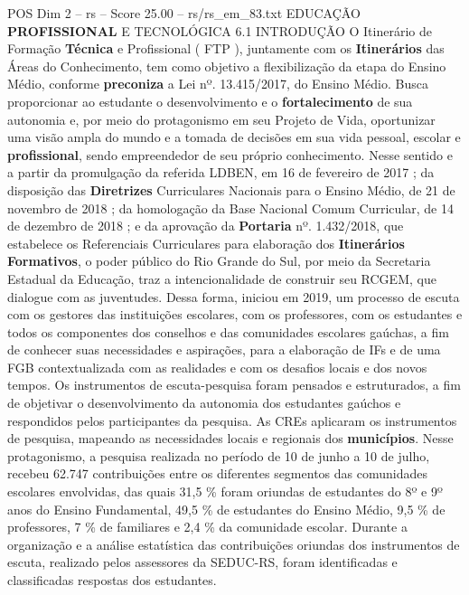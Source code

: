 \begin{textsample}{POS Dim 2 – rs – Score 25.00 – rs/rs\_em\_83.txt}  \label{ex:f2_pos_079}
EDUCAÇÃO \textbf{PROFISSIONAL} E TECNOLÓGICA 6.1 INTRODUÇÃO O Itinerário de Formação \textbf{Técnica} e Profissional ( FTP ), juntamente com os \textbf{Itinerários} das Áreas do Conhecimento, tem como objetivo a flexibilização da etapa do Ensino Médio, conforme \textbf{preconiza} a Lei nº. 13.415/2017, do Ensino Médio.
Busca proporcionar ao estudante o desenvolvimento e o \textbf{fortalecimento} de sua autonomia e, por meio do protagonismo em seu Projeto de Vida, oportunizar uma visão ampla do mundo e a tomada de decisões em sua vida pessoal, escolar e \textbf{profissional}, sendo empreendedor de seu próprio conhecimento.
Nesse sentido e a partir da promulgação da referida LDBEN, em 16 de fevereiro de 2017 ; da disposição das \textbf{Diretrizes} Curriculares Nacionais para o Ensino Médio, de 21 de novembro de 2018 ; da homologação da Base Nacional Comum Curricular, de 14 de dezembro de 2018 ; e da aprovação da \textbf{Portaria} nº. 1.432/2018, que estabelece os Referenciais Curriculares para elaboração dos \textbf{Itinerários} \textbf{Formativos}, o poder público do Rio Grande do Sul, por meio da Secretaria Estadual da Educação, traz a intencionalidade de construir seu RCGEM, que dialogue com as juventudes.
Dessa forma, iniciou em 2019, um processo de escuta com os gestores das instituições escolares, com os professores, com os estudantes e todos os componentes dos conselhos e das comunidades escolares gaúchas, a fim de conhecer suas necessidades e aspirações, para a elaboração de IFs e de uma FGB contextualizada com as realidades e com os desafios locais e dos novos tempos.
Os instrumentos de escuta-pesquisa foram pensados e estruturados, a fim de objetivar o desenvolvimento da autonomia dos estudantes gaúchos e respondidos pelos participantes da pesquisa.
As CREs aplicaram os instrumentos de pesquisa, mapeando as necessidades locais e regionais dos \textbf{municípios}.
Nesse protagonismo, a pesquisa realizada no período de 10 de junho a 10 de julho, recebeu 62.747 contribuições entre os diferentes segmentos das comunidades escolares envolvidas, das quais 31,5 \% foram oriundas de estudantes do 8º e 9º anos do Ensino Fundamental, 49,5 \% de estudantes do Ensino Médio, 9,5 \% de professores, 7 \% de familiares e 2,4 \% da comunidade escolar.
Durante a organização e a análise estatística das contribuições oriundas dos instrumentos de escuta, realizado pelos assessores da SEDUC-RS, foram identificadas e classificadas respostas dos estudantes.

\end{textsample}
